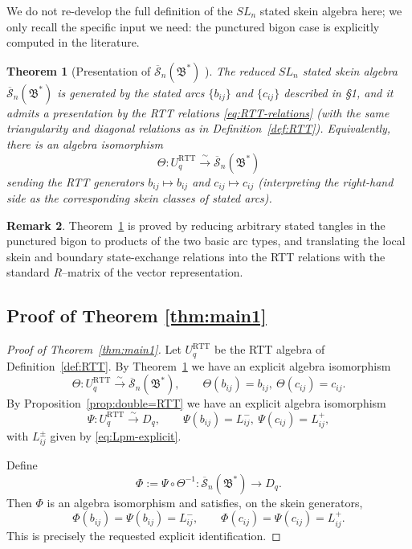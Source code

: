 \documentclass[11pt]{article}
\newcommand{\Uc}{U}
\newcommand{\fB}{\mathfrak{B}}
\newcommand{\bcS}{\overline{\mathcal S}}
\theoremstyle{plain}
\newtheorem{theorem}{Theorem}[section]
\theoremstyle{definition}
\newtheorem{remark}[theorem]{Remark}
\begin{document}
We do not re-develop the full definition of the $SL_n$ stated skein algebra here; we only recall the specific input we need: the punctured bigon case is explicitly computed in the literature.

\begin{theorem}[Presentation of $\bcS_n(\fB^*)$ {\cite[punctured biangle computation]{LeSkeinQG}}]\label{thm:skein=RTT}
The reduced $SL_n$ stated skein algebra $\bcS_n(\fB^*)$ is generated by the stated arcs $\{b_{ij}\}$ and $\{c_{ij}\}$ described in \S1, and it admits a presentation by the RTT relations \eqref{eq:RTT-relations} (with the same triangularity and diagonal relations as in Definition~\ref{def:RTT}).
Equivalently, there is an algebra isomorphism
\[
\Theta:\Uc_q^{\mathrm{RTT}}\xrightarrow{\ \sim\ }\bcS_n(\fB^*)
\]
sending the RTT generators $b_{ij}\mapsto b_{ij}$ and $c_{ij}\mapsto c_{ij}$ (interpreting the right-hand side as the corresponding skein classes of stated arcs).
\end{theorem}

\begin{remark}
Theorem~\ref{thm:skein=RTT} is proved by reducing arbitrary stated tangles in the punctured bigon to products of the two basic arc types, and translating the local skein and boundary state-exchange relations into the RTT relations with the standard $R$--matrix of the vector representation.
\end{remark}

\subsection{Proof of Theorem \ref{thm:main1}}

\begin{proof}[Proof of Theorem~\ref{thm:main1}]
Let $\Uc_q^{\mathrm{RTT}}$ be the RTT algebra of Definition~\ref{def:RTT}.
By Theorem~\ref{thm:skein=RTT} we have an explicit algebra isomorphism
\[
\Theta:\Uc_q^{\mathrm{RTT}}\xrightarrow{\sim}\bcS_n(\fB^*),\qquad
\Theta(b_{ij})=b_{ij},\ \Theta(c_{ij})=c_{ij}.
\]
By Proposition~\ref{prop:double=RTT} we have an explicit algebra isomorphism
\[
\Psi:\Uc_q^{\mathrm{RTT}}\xrightarrow{\sim}D_q,\qquad
\Psi(b_{ij})=L^-_{ij},\ \Psi(c_{ij})=L^+_{ij},
\]
with $L^\pm_{ij}$ given by \eqref{eq:Lpm-explicit}.

Define
\[
\Phi:=\Psi\circ \Theta^{-1}:\bcS_n(\fB^*)\to D_q.
\]
Then $\Phi$ is an algebra isomorphism and satisfies, on the skein generators,
\[
\Phi(b_{ij})=\Psi(b_{ij})=L^-_{ij},\qquad \Phi(c_{ij})=\Psi(c_{ij})=L^+_{ij}.
\]
This is precisely the requested explicit identification.
\end{proof}
\end{document}
